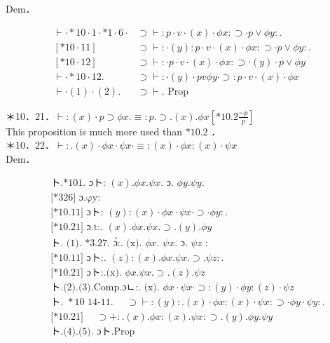 \documentclass[10pt]{article}
\begin{document}
Dem．

\[
\begin{array}{ll}
\vdash \cdot * 10 \cdot 1 \cdot * 1 \cdot 6 \cdot & \supset \vdash: p \cdot v \cdot(x) \cdot \phi x: \supset \cdot p \vee \phi y: . \\
{[* 10 \cdot 11]} & \supset \vdash: \cdot(y): p \cdot v \cdot(x) \cdot \phi x: \supset \cdot p \vee \phi y: . \\
{[* 10 \cdot 12]} & \supset \vdash: \cdot p \cdot v \cdot(x) \cdot \phi x: \supset \cdot(y) \cdot p \vee \phi y \\
\vdash \cdot * 10 \cdot 12 . & \supset \vdash: \cdot(y) \cdot p v \phi y \cdot \supset: p \cdot v \cdot(x) \cdot \phi x  \tag{2}\\
\vdash \cdot(1) \cdot(2) . & \supset \vdash . \text { Prop }
\end{array}
\]

＊10．21．$\vdash:(x) \cdot p \supset \phi x . \equiv: p . \supset .(x) . \phi x\left[* 10.2 \frac{\sim p}{p}\right]$\\
This proposition is much more used than $* 10.2$ ．\\
＊10．22．$\vdash: .(x) \cdot \phi x \cdot \psi x \cdot \equiv:(x) \cdot \phi x:(x) \cdot \psi x$\\
Dem．


\begin{align*}
& \text { ト.*101. ɔト: }(x) . \phi x . \psi x . \text { ɔ. } \phi y . \psi y .  \tag{1}\\
& \text { [*326] ɔ.φy: } \\
& \text { [*10.11] ɔト: }(y):(x) \cdot \phi x \cdot \psi x \cdot \supset \cdot \phi y: . \\
& \text { [*10.21] ɔ.t:. }(x) . \phi x . \psi x . \supset .(y) . \phi y  \tag{2}\\
& \text { ト. (1). *3.27. ɔํ:. (x). } \phi x \text {. } \psi x \text {. ɔ. } \psi z \text { : } \\
& \text { [*10.11] ɔト:. }(z):(x) . \phi x . \psi x . \supset . \psi z: . \\
& \text { [*10.21] ɔト:.(x). } \phi x . \psi x . \supset .(z) . \psi z  \tag{3}\\
& \text { ト.(2).(3).Comp.ɔㄴ:. (x). } \phi x \cdot \psi x \cdot \supset:(y) \cdot \phi y:(z) \cdot \psi z  \tag{4}\\
& \text { ト. } * 10 \text { 14-11. } \quad \supset \vdash:(y): .(x) \cdot \phi x:(x) \cdot \psi x: \supset \cdot \phi y \cdot \psi y: . \\
& \text { [*10.21] } \quad \supset+: .(x) . \phi x:(x) . \psi x: \supset .(y) . \phi y . \psi y  \tag{5}\\
& \text { ト.(4).(5). ɔト.Prop }
\end{align*}
\end{document}

